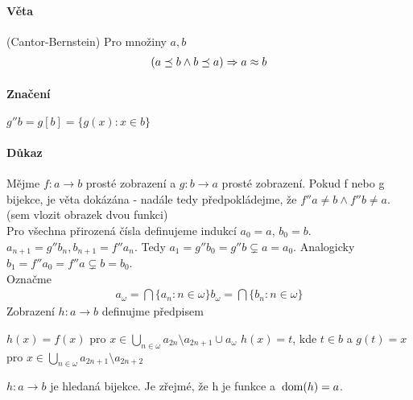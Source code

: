 \documentclass[a4paper,12pt,titlepage]{article}
\begin{document}
\paragraph{Věta}(Cantor-Bernstein) Pro množiny $a,b$
\begin{align}
	(a \preceq b \land b \preceq a) \Rightarrow a \approx b
\end{align}
\paragraph{Značení}
$g''b = g[b] = \{g(x) : x \in b\}$
\paragraph{Důkaz}
Mějme $f: a \to b$ prosté zobrazení a $g: b \to a$ prosté zobrazení. Pokud f
nebo g bijekce, je věta dokázána - nadále tedy předpokládejme, že $f''a \neq b
\land f''b \neq a$. \\
(sem vlozit obrazek dvou funkci)\\
Pro všechna přirozená čísla definujeme indukcí $a_0 = a$, $b_0 = b$. $a_{n+1} =
g''b_n, b_{n+1} = f''a_n$. Tedy $a_1 = g''b_0 = g''b \subsetneq a = a_0 $.
Analogicky $b_1 = f''a_0 = f''a \subsetneq b = b_0 $.\\
Označme 
\begin{align}
a_\omega = \bigcap\{a_n: n \in \omega\}
b_\omega = \bigcap\{b_n: n \in \omega\} 
\end{align}
Zobrazení $h: a \to b$ definujme předpisem 

$h(x) = f(x)$ pro $x \in
\bigcup_{n\in\omega} a_{2n} \setminus a_{2n+1} \cup a_\omega$ 
$h(x) = t$, kde $t \in b$ a $g(t) = x$ pro 
$x \in \bigcup_{n\in\omega} a_{2n+1} \setminus a_{2n+2}$

$h: a \to b$ je hledaná bijekce. Je zřejmé, že h je funkce a $\operatorname*{\,dom}(h) = a$.
\end{document}
